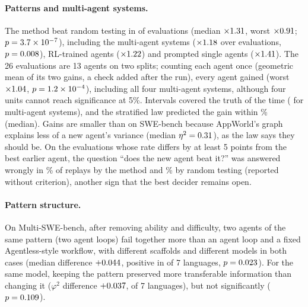 \documentclass[11pt]{article}
\newcommand{\phisq}{\varphi^2}
\begin{document}
\paragraph{Patterns and multi-agent systems.} The method beat random testing in \GEightWins{} of \NEight{} evaluations
(median $\times1.31$, worst $\times0.91$; $p=3.7\times10^{-7}$), including the multi-agent systems
($\times1.18$ over \NEightMAS{} evaluations, $p=0.008$), RL-trained agents ($\times1.22$) and prompted
single agents ($\times1.41$). The 26 evaluations are 13 agents on two splits; counting each agent once (geometric
mean of its two gains, a check added after the run), every agent gained (worst $\times1.04$,
$p=1.2\times10^{-4}$), including all four multi-agent systems, although four units cannot reach significance at 5\%.
Intervals covered the truth \CovEight{} of the time (\CovEightMAS{} for
multi-agent systems), and the stratified law predicted the gain within \LawErrEight\% (median). Gains are smaller than on
SWE-bench because AppWorld's graph explains less of a new agent's variance (median $\eta^2=0.31$), as the law
says they should be. On the \NDecEight{} evaluations whose rate differs by at least 5 points from the best earlier agent, the question
``does the new agent beat it?'' was answered wrongly in \DecGregEight\% of replays by the method and \DecResetUEight\%
by random testing (reported without criterion), another sign that the best decider remains open.

\paragraph{Pattern structure.} On Multi-SWE-bench, after removing ability and difficulty, two agents of the same
pattern (two agent loops) fail together more than an agent loop and a fixed Agentless-style workflow, with different
scaffolds and different models in both cases (median difference $+0.044$, positive in \PatPosEight{} of 7
languages, $p=0.023$). For the same model, keeping the pattern preserved more transferable information than
changing it ($\phisq$ difference $+0.037$, \PhiPosEight{} of 7 languages), but not significantly
($p=0.109$).
\end{document}

